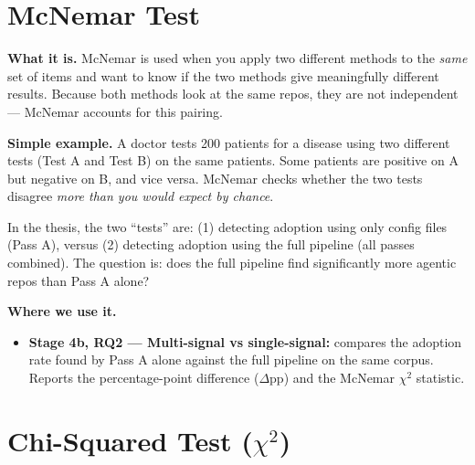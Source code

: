 \documentclass[11pt,a4paper]{article}
\begin{document}
\section{McNemar Test}

\begin{conceptbox}
\textbf{What it is.}
McNemar is used when you apply two different methods to the \emph{same} set of items and want
to know if the two methods give meaningfully different results. Because both methods look at
the same repos, they are not independent --- McNemar accounts for this pairing.

\medskip
\textbf{Simple example.}
A doctor tests 200 patients for a disease using two different tests (Test A and Test B) on the
same patients. Some patients are positive on A but negative on B, and vice versa. McNemar
checks whether the two tests disagree \emph{more than you would expect by chance}.

\medskip
In the thesis, the two ``tests'' are: (1) detecting adoption using only config files (Pass A),
versus (2) detecting adoption using the full pipeline (all passes combined). The question is:
does the full pipeline find significantly more agentic repos than Pass A alone?
\end{conceptbox}

\begin{wherebox}
\textbf{Where we use it.}
\begin{itemize}
  \item \textbf{Stage 4b, RQ2 --- Multi-signal vs single-signal:} compares the adoption rate
        found by Pass A alone against the full pipeline on the same corpus.
        Reports the percentage-point difference ($\Delta$pp) and the McNemar $\chi^2$ statistic.
\end{itemize}
\end{wherebox}

\section{Chi-Squared Test ($\chi^2$)}
\end{document}
